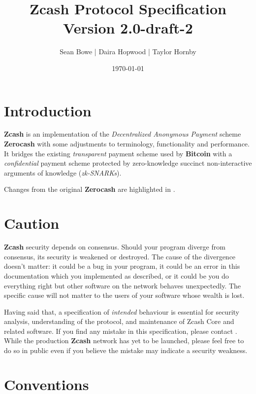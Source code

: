 \documentclass{article}
\newcommand{\todo}[1]{{\color{Sepia}\sf{TODO: #1}}}
\newcommand{\changedcolor}{magenta}
\newcommand{\setchanged}{\color{\changedcolor}}
\newcommand{\changed}[1]{{\setchanged{#1}}}
\newcommand{\term}[1]{\textsl{#1}\xspace}
\newcommand{\termbf}[1]{\textbf{#1}\xspace}
\newcommand{\Zcash}{\termbf{Zcash}}
\newcommand{\Zerocash}{\termbf{Zerocash}}
\newcommand{\Bitcoin}{\termbf{Bitcoin}}
\newcommand{\zkSNARKs}{\term{zk-SNARKs}}
\begin{document}
\title{Zcash Protocol Specification \\
\Large Version 2.0-draft-2}
\author{Sean Bowe | Daira Hopwood | Taylor Hornby}
\date{\today}
\maketitle

\tableofcontents
\newpage


\section{Introduction}

\Zcash is an implementation of the \term{Decentralized Anonymous Payment}
scheme \Zerocash \cite{ZerocashOakland} with some adjustments to terminology,
functionality and performance. It bridges the existing \emph{transparent}
payment scheme used by \Bitcoin with a \emph{confidential} payment scheme
protected by zero-knowledge succinct non-interactive arguments of knowledge
(\zkSNARKs).

Changes from the original \Zerocash are highlighted in \changed{\changedcolor}.


\section{Caution}

\Zcash security depends on consensus. Should your program diverge from
consensus, its security is weakened or destroyed. The cause of the divergence
doesn't matter: it could be a bug in your program, it could be an error in
this documentation which you implemented as described, or it could be you do
everything right but other software on the network behaves unexpectedly. The
specific cause will not matter to the users of your software whose wealth is
lost.

Having said that, a specification of \emph{intended} behaviour is essential
for security analysis, understanding of the protocol, and maintenance of
Zcash Core and related software. If you find any mistake in this specification,
please contact \todo{address}. While the production \Zcash network has yet
to be launched, please feel free to do so in public even if you believe the
mistake may indicate a security weakness.


\section{Conventions}
\end{document}

